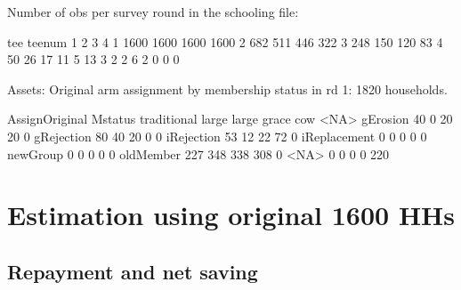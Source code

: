 



Number of obs per survey round in the schooling file:
\begin{Schunk}
\begin{Soutput}
      tee
teenum    1    2    3    4
     1 1600 1600 1600 1600
     2  682  511  446  322
     3  248  150  120   83
     4   50   26   17   11
     5   13    3    2    2
     6    2    0    0    0
\end{Soutput}
\end{Schunk}
Assets: Original arm assignment by membership status in rd 1: 1820 households.
\begin{Schunk}
\begin{Soutput}
              AssignOriginal
Mstatus        traditional large large grace cow <NA>
  gErosion              40     0          20  20    0
  gRejection            80    40          20   0    0
  iRejection            53    12          22  72    0
  iReplacement           0     0           0   0    0
  newGroup               0     0           0   0    0
  oldMember            227   348         338 308    0
  <NA>                   0     0           0   0  220
\end{Soutput}
\end{Schunk}







\section{Estimation using original 1600 HHs}


\subsection{Repayment and net saving}


